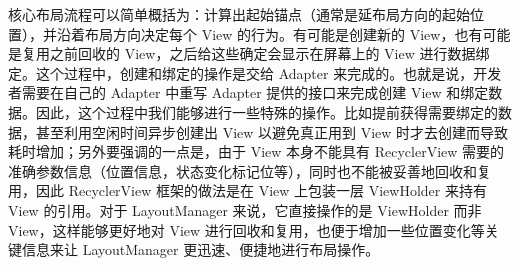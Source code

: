 核心布局流程可以简单概括为：计算出起始锚点（通常是延布局方向的起始位置），并沿着布局方向决定每个 View 的行为。有可能是创建新的 View，也有可能是复用之前回收的 View，之后给这些确定会显示在屏幕上的 View 进行数据绑定。这个过程中，创建和绑定的操作是交给 Adapter 来完成的。也就是说，开发者需要在自己的 Adapter 中重写 Adapter 提供的接口来完成创建 View 和绑定数据。因此，这个过程中我们能够进行一些特殊的操作。比如提前获得需要绑定的数据，甚至利用空闲时间异步创建出 View 以避免真正用到 View 时才去创建而导致耗时增加；另外要强调的一点是，由于 View 本身不能具有 RecyclerView 需要的准确参数信息（位置信息，状态变化标记位等），同时也不能被妥善地回收和复用，因此 RecyclerView 框架的做法是在 View 上包装一层 ViewHolder 来持有 View 的引用。对于 LayoutManager 来说，它直接操作的是 ViewHolder 而非 View，这样能够更好地对 View 进行回收和复用，也便于增加一些位置变化等关键信息来让 LayoutManager 更迅速、便捷地进行布局操作。




